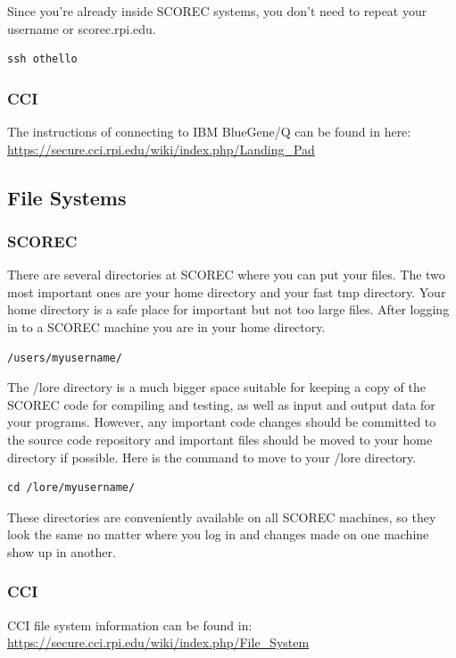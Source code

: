 \documentclass{article}
\begin{document}
Since you're already inside SCOREC systems, you don't need to repeat your username or scorec.rpi.edu.

\begin{lstlisting}
ssh othello
\end{lstlisting}

\subsubsection{CCI}
The instructions of connecting to IBM BlueGene/Q can be found in here: \\
\url{https://secure.cci.rpi.edu/wiki/index.php/Landing_Pad}

\subsection{File Systems}
\label{ch:1.2}
\subsubsection{SCOREC}
There are several directories at SCOREC where you can put your files. The two most important ones are your home directory and your fast tmp directory. Your home directory is a safe place for important but not too large files. After logging in to a SCOREC machine you are in your home directory.
\begin{lstlisting}
/users/myusername/
\end{lstlisting}
The /lore directory is a much bigger space suitable for keeping a copy of the SCOREC code for compiling and testing, as well as input and output data for your programs. However, any important code changes should be committed to the source code repository and important files should be moved to your home directory if possible. Here is the command to move to your /lore directory.
\begin{lstlisting}
cd /lore/myusername/
\end{lstlisting}

These directories are conveniently available on all SCOREC machines, so they look the same no matter where you log in and changes made on one machine show up in another.

\subsubsection{CCI}
CCI file system information can be found in:\\
\url{https://secure.cci.rpi.edu/wiki/index.php/File\_System}
\end{document}
